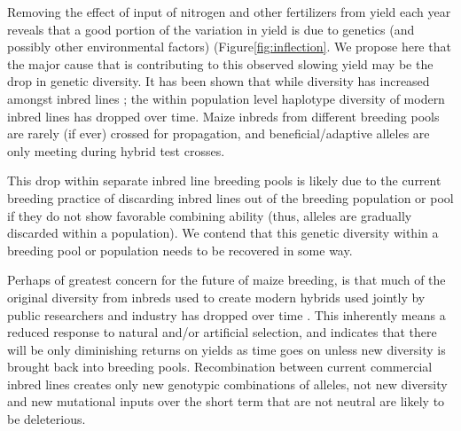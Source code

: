 \documentclass[12pt]{article}
\begin{document}
Removing the effect of input of nitrogen and other fertilizers from yield each year reveals that a good portion of the variation in yield is due to genetics (and possibly other environmental factors) (Figure\ref{fig:inflection}. 
We propose here that the major cause that is contributing to this observed slowing yield may be the drop in genetic diversity. 
It has been shown that while diversity has increased amongst inbred lines \citep{Gerke:2013tw}; the within population level haplotype diversity of modern inbred lines \citep{van2012historical} has dropped over time. 
%
%
Maize inbreds from different breeding pools are rarely (if ever) crossed for propagation, and beneficial/adaptive alleles are only meeting during hybrid test crosses. 

This drop within separate inbred line breeding pools is likely due to the current breeding practice of discarding inbred lines out of the breeding population or pool if they do not show favorable combining ability (thus, alleles are gradually discarded within a population).  
We contend that this genetic diversity within a breeding pool or population needs to be recovered in some way.  
%
%

Perhaps of greatest concern for the future of maize breeding, is that much of the original diversity from inbreds used to create modern hybrids used jointly by public researchers and industry has dropped over time \citep{Gerke:2013tw}. 
This inherently means a reduced response to natural and/or artificial selection, and indicates that there will be only diminishing returns on yields as time goes on unless new diversity is brought back into breeding pools. 
Recombination between current commercial inbred lines creates only new genotypic combinations of alleles, not new diversity and new mutational inputs over the short term that are not neutral are likely to be deleterious.
\end{document}
